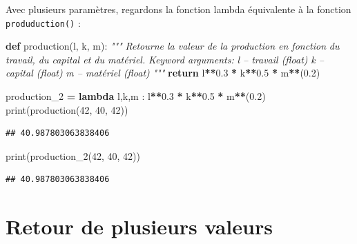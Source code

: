 \documentclass[12pt,]{book}
\newenvironment{Shaded}{\begin{snugshade}}{\end{snugshade}}
\newcommand{\KeywordTok}[1]{\textcolor[rgb]{0.13,0.29,0.53}{\textbf{#1}}}
\newcommand{\DecValTok}[1]{\textcolor[rgb]{0.00,0.00,0.81}{#1}}
\newcommand{\FloatTok}[1]{\textcolor[rgb]{0.00,0.00,0.81}{#1}}
\newcommand{\CommentTok}[1]{\textcolor[rgb]{0.56,0.35,0.01}{\textit{#1}}}
\newcommand{\ControlFlowTok}[1]{\textcolor[rgb]{0.13,0.29,0.53}{\textbf{#1}}}
\newcommand{\OperatorTok}[1]{\textcolor[rgb]{0.81,0.36,0.00}{\textbf{#1}}}
\newcommand{\BuiltInTok}[1]{#1}
\newcommand{\NormalTok}[1]{#1}
\numberwithin{equation}{section}
\numberwithin{countremarque}{section}
\begin{document}
Avec plusieurs paramètres, regardons la fonction lambda équivalente à la
fonction \texttt{produduction()} :

\begin{Shaded}
\begin{Highlighting}[]
\KeywordTok{def}\NormalTok{ production(l, k, m):}
  \CommentTok{"""}
\CommentTok{  Retourne la valeur de la production en fonction}
\CommentTok{  du travail, du capital et du matériel.}
\CommentTok{  }
\CommentTok{  Keyword arguments:}
\CommentTok{  l -- travail (float)}
\CommentTok{  k -- capital (float)}
\CommentTok{  m -- matériel (float)}
\CommentTok{  """}
  \ControlFlowTok{return}\NormalTok{ l}\OperatorTok{**}\FloatTok{0.3} \OperatorTok{*}\NormalTok{ k}\OperatorTok{**}\FloatTok{0.5} \OperatorTok{*}\NormalTok{ m}\OperatorTok{**}\NormalTok{(}\FloatTok{0.2}\NormalTok{)}
\end{Highlighting}
\end{Shaded}

\begin{Shaded}
\begin{Highlighting}[]
\NormalTok{production_2 }\OperatorTok{=} \KeywordTok{lambda}\NormalTok{ l,k,m : l}\OperatorTok{**}\FloatTok{0.3} \OperatorTok{*}\NormalTok{ k}\OperatorTok{**}\FloatTok{0.5} \OperatorTok{*}\NormalTok{ m}\OperatorTok{**}\NormalTok{(}\FloatTok{0.2}\NormalTok{)}
\BuiltInTok{print}\NormalTok{(production(}\DecValTok{42}\NormalTok{, }\DecValTok{40}\NormalTok{, }\DecValTok{42}\NormalTok{))}
\end{Highlighting}
\end{Shaded}

\begin{lstlisting}
## 40.987803063838406
\end{lstlisting}

\begin{Shaded}
\begin{Highlighting}[]
\BuiltInTok{print}\NormalTok{(production_2(}\DecValTok{42}\NormalTok{, }\DecValTok{40}\NormalTok{, }\DecValTok{42}\NormalTok{))}
\end{Highlighting}
\end{Shaded}

\begin{lstlisting}
## 40.987803063838406
\end{lstlisting}

\section{Retour de plusieurs valeurs}\label{retour-de-plusieurs-valeurs}
\end{document}
